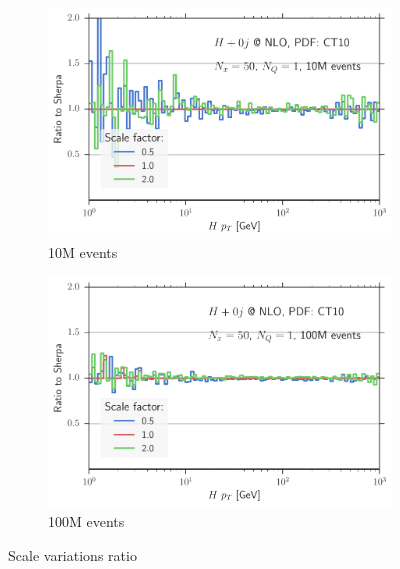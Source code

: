 \begin{figure}
\centering
\begin{subfigure}[]{0.49\textwidth}
	\includegraphics[width=\textwidth]{images/scalesvar_ratio_hpt_10M.pdf}
	\caption{10M events}
\end{subfigure}
\hfill
\begin{subfigure}[]{0.49\textwidth}
	\includegraphics[width=\textwidth]{images/scalesvar_ratio_hpt_100M.pdf}
	\caption{100M events}
\end{subfigure}
\caption{Scale variations ratio}
\end{figure}
%
